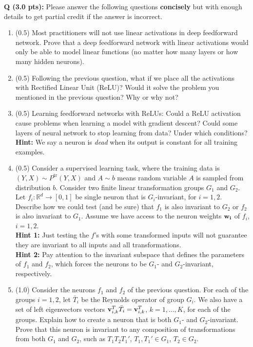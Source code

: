 \documentclass{article}
\newcounter{questionno}
\newcounter{partno}
\newcommand{\question}[1]{
\noindent
\newline
\stepcounter{questionno}
\setcounter{partno}{0}
{\bf Q\arabic{questionno} (#1 pts): }
}
\begin{document}
\newpage
\question{3.0} Please answer the following questions \textbf{concisely} but with enough details to get partial credit if the answer is incorrect. 

\begin{enumerate}


\item (0.5) Most practitioners will not use linear activations in deep feedforward network. Prove that a deep feedforward network with linear activations would only be able to model linear functions (no matter how many layers or how many hidden neurons).
\vspace{3in}

\item (0.5) Following the previous question, what if we place all the activations with Rectified Linear Unit (ReLU)? Would it solve the problem you mentioned in the previous question? Why or why not? \\
\newpage

\item (0.5) Learning  feedforward networks with ReLUs: Could a ReLU activation cause problems when learning a model with gradient descent? Could some layers of neural network to stop learning from data? Under which conditions? \\
{\bf Hint:} We say a neuron is {\em dead} when its output is constant for all training examples.
\vspace{3in}

\item (0.5)  Consider a supervised learning task, where the training data is $(Y,X) \sim P^\text{tr}(Y,X)$ and $A \sim b$ means random variable $A$ is sampled from distribution $b$. Consider two finite linear transformation groups $G_1$ and $G_2$. Let $f_i: \mathbb{R}^d \to [0,1]$ be single neuron that is $G_i$-invariant, for $i=1,2$. Describe how we could test (and be sure) that $f_1$ is also invariant to $G_2$ or $f_2$ is also invariant to $G_1$. Assume we have access to the neuron weights ${\bf w_i}$ of $f_i$, $i=1,2$. \\
{\bf Hint 1:} Just testing the $f$'s with some transformed inputs will not guarantee they are invariant to all inputs and all transformations.\\
{\bf Hint 2:} Pay attention to the invariant subspace that defines the parameters of $f_1$ and $f_2$, which forces the neurons to be $G_1$- and $G_2$-invariant, respectively.
\newpage

\item (1.0) Consider the neurons $f_1$ and $f_2$ of the previous question. For each of the groups $i=1,2$, let $\bar{T}_i$ be the Reynolds operator of group $G_i$. We also have a set of left eigenvectors vectors
${\bf v}_{i,k}^T \bar{T}_i = {\bf v}_{i,k}^T$, $k=1,\ldots,K$, for each of the groups. Explain how to create a neuron that is both $G_1$- and $G_2$-invariant. Prove that this neuron is invariant to any composition of transformations from both $G_1$ and $G_2$, such as $T_1 T_2 T_1'$, $T_1,T_1' \in G_1$, $T_2 \in G_2$.
%

\vspace{3in}



\end{enumerate}
\end{document}

